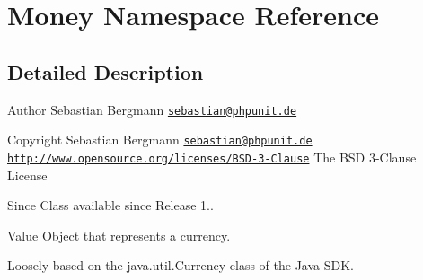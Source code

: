 \hypertarget{namespaceMoney}{}\section{Money Namespace Reference}
\label{namespaceMoney}


\subsection{Detailed Description}
\begin{DoxyAuthor}{Author}
Sebastian Bergmann \href{mailto:sebastian@phpunit.de}{\tt sebastian@phpunit.\+de} 
\end{DoxyAuthor}
\begin{DoxyCopyright}{Copyright}
Sebastian Bergmann \href{mailto:sebastian@phpunit.de}{\tt sebastian@phpunit.\+de}  \href{http://www.opensource.org/licenses/BSD-3-Clause}{\tt http\+://www.\+opensource.\+org/licenses/\+B\+S\+D-\/3-\/\+Clause} The B\+S\+D 3-\/\+Clause License 
\end{DoxyCopyright}
\begin{DoxySince}{Since}
Class available since Release 1.. 
\end{DoxySince}
Value Object that represents a currency.

Loosely based on the java.\+util.\+Currency class of the Java S\+D\+K.


